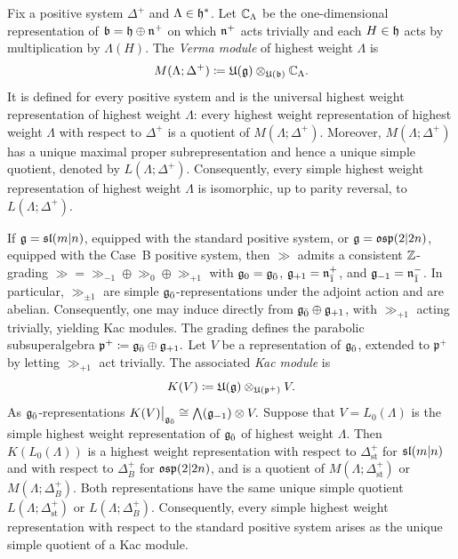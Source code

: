 \begin{example} \label{ex::Verma_modules} Fix a positive system $\Delta^{+}$ and $\Lambda \in \hh^{\ast}$. Let $\CC _\Lambda$ be the one-dimensional representation of $\bb=\hh\oplus\nn^+$ on which $\nn^+$ acts trivially and each $H\in\hh$ acts by multiplication by $\Lambda(H)$. The \emph{Verma module} of highest weight $\Lambda$ is
\begin{equation}
M(\Lambda;\Delta^+)
\coloneqq
\UE(\gg)\otimes_{\UE(\bb)}\CC _\Lambda.
\end{equation}
It is defined for every positive system and is the universal highest weight representation of highest weight $\Lambda$: every highest weight representation of highest weight $\Lambda$ with respect to $\Delta^{+}$ is a quotient of $M(\Lambda;\Delta^+)$. Moreover, $M(\Lambda;\Delta^+)$ has a unique maximal proper subrepresentation and hence a unique simple quotient, denoted by $L(\Lambda;\Delta^+)$. Consequently, every simple highest weight representation of highest weight $\Lambda$ is isomorphic, up to parity reversal, to $L(\Lambda;\Delta^+)$.
\end{example}

\begin{example} If $\gg=\sl(m\vert n)$, equipped with the standard positive system, or $\gg=\osp(2\vert 2n)$, equipped with the Case~B positive system, then $\gg$ admits a consistent $\ZZ$-grading $\gg=\gg_{-1}\oplus\gg_0\oplus\gg_{+1}$ with $\gg_0=\even$, $\gg_{+1}=\nn_{\bar1}^{+}$, and $\gg_{-1}=\nn_{\bar1}^{-}$. In particular, $\gg_{\pm1}$ are simple $\even$-representations under the adjoint action and are abelian. Consequently, one may induce directly from $\even\oplus\gg_{+1}$, with $\gg_{+1}$ acting trivially, yielding Kac modules. The grading defines the parabolic subsuperalgebra
$
\mathfrak p^+\coloneqq\even\oplus\gg_{+1}.
$
Let $V$ be a representation of $\even$, extended to $\mathfrak p^+$ by letting $\gg_{+1}$ act trivially. The associated \emph{Kac module} is
\begin{equation}
K(V)
\coloneqq
\UE(\gg)\otimes_{\UE(\mathfrak p^+)}V.
\end{equation}
As $\even$-representations 
$
K(V)\big\vert_{\even}
\cong
\bigwedge(\gg_{-1})\otimes V.
$ 
Suppose that $V=L_{0}(\Lambda)$ is the simple highest weight representation of $\even$ of highest weight $\Lambda$. Then $K(L_0(\Lambda))$ is a highest weight representation with respect to $\Delta_{\mathrm{st}}^{+}$ for $\sl(m\vert n)$ and with respect to $\Delta_{B}^{+}$ for $\osp(2\vert 2n)$, and is a quotient of $M(\Lambda;\Delta_{\mathrm{st}}^{+})$ or $M(\Lambda;\Delta_{B}^{+})$. Both representations have the same unique simple quotient $L(\Lambda;\Delta_{\mathrm{st}}^{+})$ or $L(\Lambda;\Delta_{B}^{+})$. Consequently, every simple highest weight representation with respect to the standard positive system arises as the unique simple quotient of a Kac module.
\end{example}

